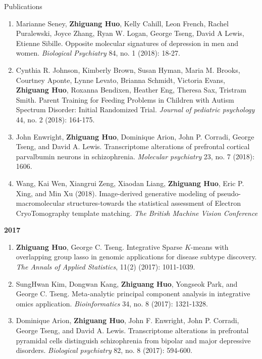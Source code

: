 \documentclass{resume} %
\begin{document}
\begin{rSection}{Publications}
\begin{enumerate}[noitemsep,topsep=0pt, resume]
\item Marianne Seney,  {\bf Zhiguang Huo},  Kelly Cahill, Leon French, Rachel Puralewski, Joyce Zhang, Ryan W. Logan, George Tseng, David A Lewis, Etienne Sibille. Opposite molecular signatures of depression in men and women. \emph{Biological Psychiatry}  84, no. 1 (2018): 18-27.

\item 
Cynthia R. Johnson, Kimberly Brown, Susan Hyman, Maria M. Brooks, Courtney Aponte, Lynne Levato, Brianna Schmidt,
Victoria Evans, {\bf Zhiguang Huo},  Roxanna Bendixen, Heather Eng, Theresa Sax, Tristram Smith.
Parent Training for Feeding Problems in Children with Autism Spectrum Disorder: Initial Randomized Trial. \emph{Journal of pediatric psychology} 44, no. 2 (2018): 164-175.

\item 
John Enwright, {\bf Zhiguang Huo}, Dominique Arion, John P. Corradi, George Tseng, and David A. Lewis. 
Transcriptome alterations of prefrontal cortical parvalbumin neurons in schizophrenia. 
\emph{Molecular psychiatry} 23, no. 7 (2018): 1606.


\item 
Wang, Kai Wen, Xiangrui Zeng, Xiaodan Liang, {\bf Zhiguang Huo}, Eric P. Xing, and Min Xu (2018). Image-derived generative modeling of pseudo-macromolecular structures-towards the statistical assessment of Electron CryoTomography template matching. \emph{The British Machine Vision Conference}

\end{enumerate}

\textbf{2017}
\begin{enumerate}[noitemsep,topsep=0pt, resume]

\item {\bf Zhiguang Huo}, George C. Tseng. 
    Integrative Sparse $K$-means with overlapping group lasso in genomic applications for disease subtype discovery.
    \emph{The Annals of Applied Statistics}, 11(2) (2017): 1011-1039.

\item 
SungHwan Kim, Dongwan Kang, {\bf Zhiguang Huo}, Yongseok Park, and George C. Tseng. 
Meta-analytic principal component analysis in integrative omics application. 
\emph{Bioinformatics} 34, no. 8 (2017): 1321-1328.


\item  
Dominique Arion, {\bf Zhiguang Huo}, John F. Enwright, John P. Corradi, George Tseng, and David A. Lewis. Transcriptome alterations in prefrontal pyramidal cells distinguish schizophrenia from bipolar and major depressive disorders. \emph{Biological psychiatry} 82, no. 8 (2017): 594-600.




\end{enumerate}
\end{rSection}
\end{document}
